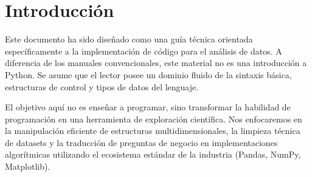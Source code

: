\chapter{Introducción}

Este documento ha sido diseñado como una guía técnica orientada específicamente a la implementación de código para el análisis de datos. A diferencia de los manuales convencionales, este material no es una introducción a Python. Se asume que el lector posee un dominio fluido de la sintaxis básica, estructuras de control y tipos de datos del lenguaje.

El objetivo aquí no es enseñar a programar, sino transformar la habilidad de programación en una herramienta de exploración científica. Nos enfocaremos en la manipulación eficiente de estructuras multidimensionales, la limpieza técnica de datasets y la traducción de preguntas de negocio en implementaciones algorítmicas utilizando el ecosistema estándar de la industria (Pandas, NumPy, Matplotlib).